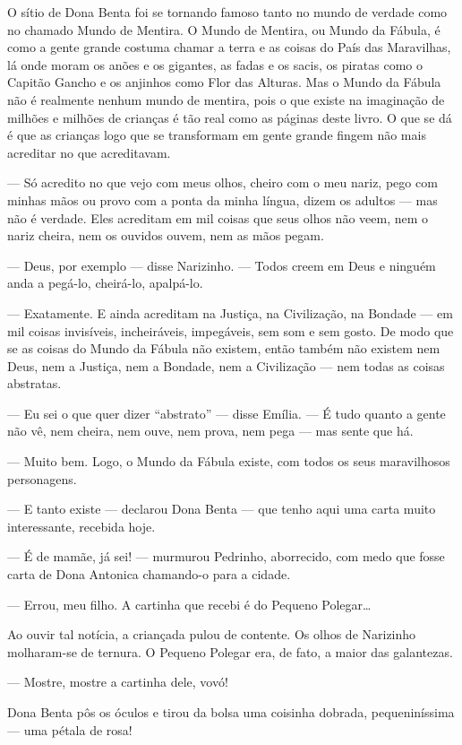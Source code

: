 O sítio de Dona Benta foi se tornando famoso tanto no mundo de verdade
como no chamado Mundo de Mentira. O Mundo de Mentira, ou Mundo da
Fábula, é como a gente grande costuma chamar a terra e as coisas do País
das Maravilhas, lá onde moram os anões e os gigantes, as fadas e os
sacis, os piratas como o Capitão Gancho e os anjinhos como Flor das
Alturas. Mas o Mundo da Fábula não é realmente nenhum mundo de mentira,
pois o que existe na imaginação de milhões e milhões de crianças é tão
real como as páginas deste livro. O que se dá é que as crianças logo que
se transformam em gente grande fingem não mais acreditar no que
acreditavam.

--- Só acredito no que vejo com meus olhos, cheiro com o meu nariz, pego
com minhas mãos ou provo com a ponta da minha língua, dizem os adultos
--- mas não é verdade. Eles acreditam em mil coisas que seus olhos não
veem, nem o nariz cheira, nem os ouvidos ouvem, nem as mãos pegam.

--- Deus, por exemplo --- disse Narizinho. --- Todos creem em Deus e
ninguém anda a pegá-lo, cheirá-lo, apalpá-lo.

--- Exatamente. E ainda acreditam na Justiça, na Civilização, na Bondade
--- em mil coisas invisíveis, incheiráveis, impegáveis, sem som e sem
gosto. De modo que se as coisas do Mundo da Fábula não existem, então
também não existem nem Deus, nem a Justiça, nem a Bondade, nem a
Civilização --- nem todas as coisas abstratas.

--- Eu sei o que quer dizer ``abstrato'' --- disse Emília. --- É tudo
quanto a gente não vê, nem cheira, nem ouve, nem prova, nem pega --- mas
sente que há.

--- Muito bem. Logo, o Mundo da Fábula existe, com todos os seus
maravilhosos personagens.

--- E tanto existe --- declarou Dona Benta --- que tenho aqui uma carta
muito interessante, recebida hoje.

--- É de mamãe, já sei! --- murmurou Pedrinho, aborrecido, com medo que
fosse carta de Dona Antonica chamando-o para a cidade.

--- Errou, meu filho. A cartinha que recebi é do Pequeno Polegar\ldots{}

Ao ouvir tal notícia, a criançada pulou de contente. Os olhos de
Narizinho molharam-se de ternura. O Pequeno Polegar era, de fato, a
maior das galantezas.

--- Mostre, mostre a cartinha dele, vovó!

Dona Benta pôs os óculos e tirou da bolsa uma coisinha dobrada,
pequeniníssima --- uma pétala de rosa!

